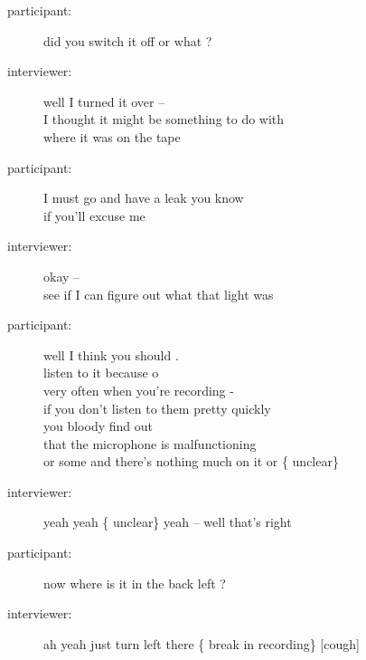 \documentclass{article}
\newcommand{\turn}[2]{
\item[#1:] #2
}
\begin{document}
\begin{description}
\turn{participant}{did you switch it off or what ?}

\turn{interviewer}{well I turned it over --\\
I thought it might be something to do with\\
where it was on the tape}

\turn{participant}{I must go and have a leak you know\\
if you'll excuse me}

\turn{interviewer}{okay --\\
see if I can figure out what that light was}

\turn{participant}{well I think you should .\\
listen to it because o\\
very often when you're recording -\\
if you don't listen to them pretty quickly\\
you bloody find out\\
that the microphone is malfunctioning\\
or some and there's nothing much on it or \{ unclear\} }

\turn{interviewer}{yeah yeah \{ unclear\}  yeah -- well that's right}

\turn{participant}{now where is it in the back left ?}

\turn{interviewer}{ah yeah just turn left there \{ break in recording\}  [cough]}


\end{description}
\end{document}
